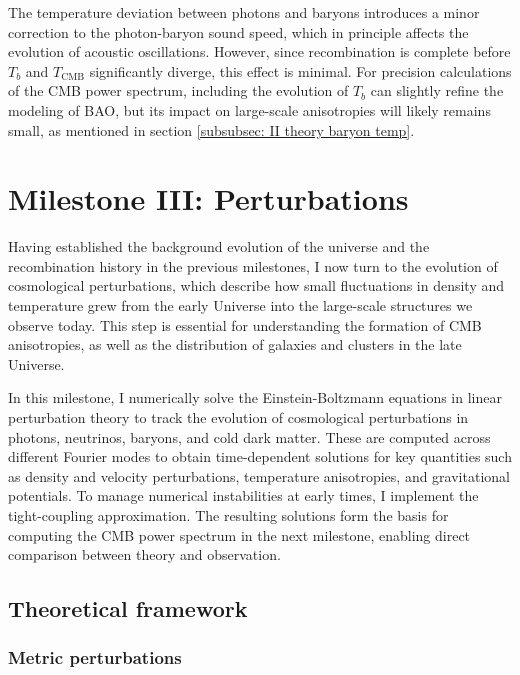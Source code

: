 \documentclass{aa}
\numberwithin{equation}{section}
\numberwithin{table}{section}
\numberwithin{figure}{section}
\begin{document}
The temperature deviation between photons and baryons introduces a minor correction to the photon-baryon sound speed, which in principle affects the evolution of acoustic oscillations. However, since recombination is complete before $T_b$ and $T_\text{CMB}$ significantly diverge, this effect is minimal. For precision calculations of the CMB power spectrum, including the evolution of $T_b$ can slightly refine the modeling of BAO, but its impact on large-scale anisotropies will likely remains small, as mentioned in section \ref{subsubsec: II theory baryon temp}.








\section{Milestone III: Perturbations}\label{sec: milestone III}
Having established the background evolution of the universe and the recombination history in the previous milestones, I now turn to the evolution of cosmological perturbations, which describe how small fluctuations in density and temperature grew from the early Universe into the large-scale structures we observe today. This step is essential for understanding the formation of CMB anisotropies, as well as the distribution of galaxies and clusters in the late Universe. 

In this milestone, I numerically solve the Einstein-Boltzmann equations in linear perturbation theory to track the evolution of cosmological perturbations in photons, neutrinos, baryons, and cold dark matter. These are computed across different Fourier modes to obtain time-dependent solutions for key quantities such as density and velocity perturbations, temperature anisotropies, and gravitational potentials. To manage numerical instabilities at early times, I implement the tight-coupling approximation. The resulting solutions form the basis for computing the CMB power spectrum in the next milestone, enabling direct comparison between theory and observation.

\subsection{Theoretical framework}\label{subsec: III theory}
\subsubsection{Metric perturbations}
\end{document}
